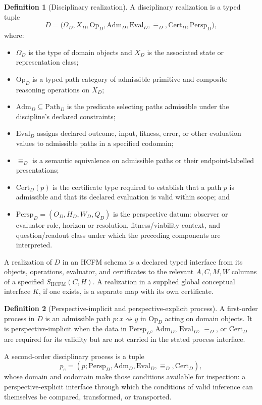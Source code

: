 \documentclass[11pt]{article}
\theoremstyle{definition}
\newtheorem{definition}{Definition}
\begin{document}
\begin{definition}[Disciplinary realization]
A disciplinary realization is a typed tuple
\begin{equation}
D = \big(\Omega_D, X_D, \mathrm{Op}_D, \mathrm{Adm}_D, \mathrm{Eval}_D, \equiv_D, \mathrm{Cert}_D, \mathrm{Persp}_D\big), \tag{S29}
\end{equation}
where:
\begin{itemize}
\item $\Omega_D$ is the type of domain objects and $X_D$ is the associated state or representation class;
\item $\mathrm{Op}_D$ is a typed path category of admissible primitive and composite reasoning operations on $X_D$;
\item $\mathrm{Adm}_D \subseteq \mathrm{Path}_D$ is the predicate selecting paths admissible under the discipline's declared constraints;
\item $\mathrm{Eval}_D$ assigns declared outcome, input, fitness, error, or other evaluation values to admissible paths in a specified codomain;
\item $\equiv_D$ is a semantic equivalence on admissible paths or their endpoint-labelled presentations;
\item $\mathrm{Cert}_D(p)$ is the certificate type required to establish that a path $p$ is admissible and that its declared evaluation is valid within scope; and
\item $\mathrm{Persp}_D = (O_D, H_D, W_D, Q_D)$ is the perspective datum: observer or evaluator role, horizon or resolution, fitness/viability context, and question/readout class under which the preceding components are interpreted.
\end{itemize}
A realization of $D$ in an HCFM schema is a declared typed interface from its objects, operations, evaluator, and certificates to the relevant $A, C, M, W$ columns of a specified $S_{\mathrm{HCFM}}(C, H)$. A realization in a supplied global conceptual interface $K$, if one exists, is a separate map with its own certificate.
\end{definition}

\begin{definition}[Perspective-implicit and perspective-explicit process]
A first-order process in $D$ is an admissible path $p : x \rightsquigarrow y$ in $\mathrm{Op}_D$ acting on domain objects. It is perspective-implicit when the data in $\mathrm{Persp}_D$, $\mathrm{Adm}_D$, $\mathrm{Eval}_D$, $\equiv_D$, or $\mathrm{Cert}_D$ are required for its validity but are not carried in the stated process interface.

A second-order disciplinary process is a tuple
\begin{equation}
p_e = (p; \mathrm{Persp}_D, \mathrm{Adm}_D, \mathrm{Eval}_D, \equiv_D, \mathrm{Cert}_D), \tag{S30}
\end{equation}
whose domain and codomain make those conditions available for inspection: a perspective-explicit interface through which the conditions of valid inference can themselves be compared, transformed, or transported.
\end{definition}
\end{document}
